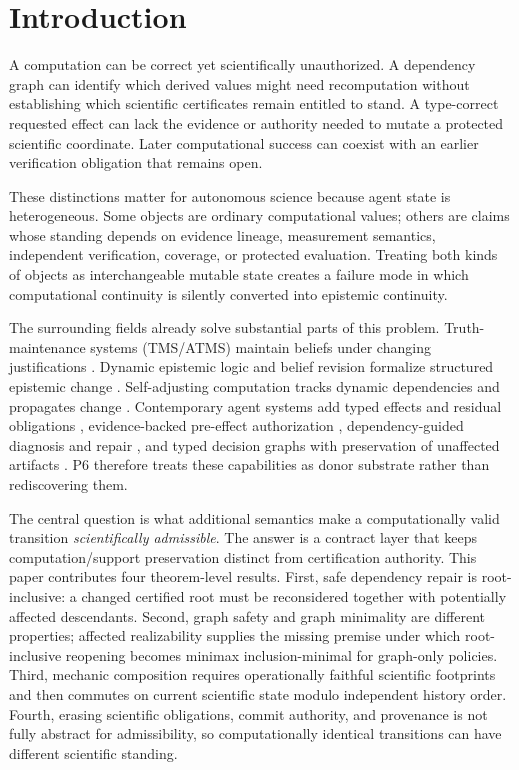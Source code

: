 \documentclass[11pt]{article}
\begin{document}
\section{Introduction}
A computation can be correct yet scientifically unauthorized. A dependency graph can identify which derived values might need recomputation without establishing which scientific certificates remain entitled to stand. A type-correct requested effect can lack the evidence or authority needed to mutate a protected scientific coordinate. Later computational success can coexist with an earlier verification obligation that remains open.

These distinctions matter for autonomous science because agent state is heterogeneous. Some objects are ordinary computational values; others are claims whose standing depends on evidence lineage, measurement semantics, independent verification, coverage, or protected evaluation. Treating both kinds of objects as interchangeable mutable state creates a failure mode in which computational continuity is silently converted into epistemic continuity.

The surrounding fields already solve substantial parts of this problem. Truth-maintenance systems (TMS/ATMS) maintain beliefs under changing justifications \cite{doyle1979,dekleer1986a,dekleer1986b}. Dynamic epistemic logic and belief revision formalize structured epistemic change \cite{agm1985,del2007}. Self-adjusting computation tracks dynamic dependencies and propagates change \cite{acar2002}. Contemporary agent systems add typed effects and residual obligations \cite{etas2026}, evidence-backed pre-effect authorization \cite{fava2026}, dependency-guided diagnosis and repair \cite{agenttether2026,rollback2026}, and typed decision graphs with preservation of unaffected artifacts \cite{boardroom2026}. P6 therefore treats these capabilities as donor substrate rather than rediscovering them.

The central question is what additional semantics make a computationally valid transition \emph{scientifically admissible}. The answer is a contract layer that keeps computation/support preservation distinct from certification authority. This paper contributes four theorem-level results. First, safe dependency repair is root-inclusive: a changed certified root must be reconsidered together with potentially affected descendants. Second, graph safety and graph minimality are different properties; affected realizability supplies the missing premise under which root-inclusive reopening becomes minimax inclusion-minimal for graph-only policies. Third, mechanic composition requires operationally faithful scientific footprints and then commutes on current scientific state modulo independent history order. Fourth, erasing scientific obligations, commit authority, and provenance is not fully abstract for admissibility, so computationally identical transitions can have different scientific standing.
\end{document}
